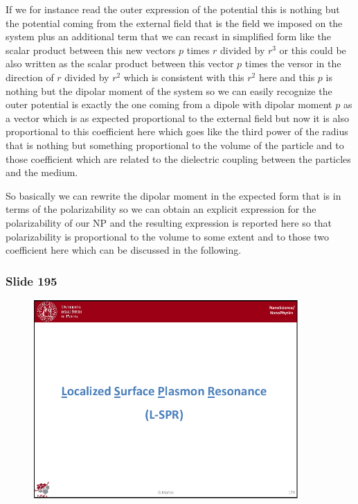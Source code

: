 \documentclass[../main/main.tex]{subfiles}
\begin{document}
If we for instance read the outer expression of the potential this is nothing but the potential coming from the external field that is the field we imposed on the system plus an additional term that we can recast in simplified form like the scalar product between this new vectors $p$ times $r$ divided by $r^3$ or this could be also written as the scalar product between this vector $p$ times the versor in the direction of $r$ divided by $r^2$ which is consistent with this $r^2$ here and this $p$ is nothing but the dipolar moment of the system so we can easily recognize the outer potential is exactly the one coming from a dipole with dipolar moment $p$ as a vector which is as expected proportional to the external field but now it is also proportional to this coefficient here which goes like the third power of the radius that is nothing but something proportional to the volume of  the particle and to those coefficient which are related to the dielectric coupling between the particles and the medium. 

So basically we can rewrite the dipolar moment in the expected form that is in terms of the polarizability so we can obtain an explicit expression for the polarizability of our NP and the resulting expression is reported here so that polarizability is proportional to the volume to some extent and to those two coefficient here which can be discussed in the following. 

\newpage
\subsubsection{Slide 195}

\begin{figure}[h!]
\centering
\includegraphics[page=17,width=0.9\textwidth]{../lessons/pdf_file/11_lesson.pdf}
\end{figure}
\end{document}
